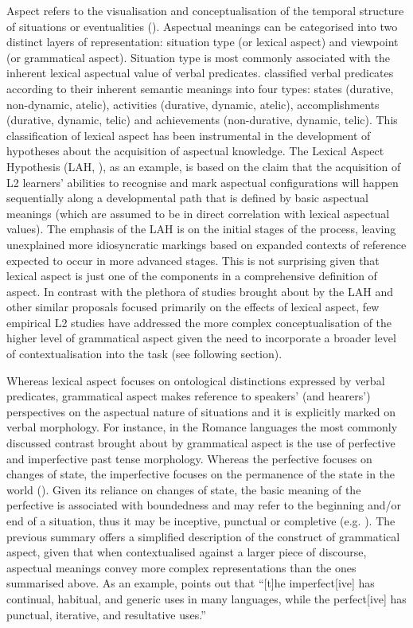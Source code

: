\documentclass[output=paper,modfonts,nonflat,newtxmath]{langsci/langscibook}
\begin{document}
Aspect refers to the visualisation and conceptualisation of the temporal structure of situations or eventualities (\citealt{Comrie1976, Dahl1985, Smith1997}). Aspectual meanings can be categorised into two distinct layers of representation: situation type (or lexical aspect) and viewpoint (or grammatical aspect). Situation type is most commonly associated with the inherent lexical aspectual value of verbal predicates. \citet{Vendler1967} classified verbal predicates according to their inherent semantic meanings into four types: states (durative, non-dynamic, atelic), activities (durative, dynamic, atelic), accomplishments (durative, dynamic, telic) and achievements (non-durative, dynamic, telic). This classification of lexical aspect has been instrumental in the development of hypotheses about the acquisition of aspectual knowledge. The Lexical Aspect Hypothesis (LAH, \citealt{Andersen1991}), as an example, is based on the claim that the acquisition of L2 learners’ abilities to recognise and mark aspectual configurations will happen sequentially along a developmental path that is defined by basic aspectual meanings (which are assumed to be in direct correlation with lexical aspectual values). The emphasis of the LAH is on the initial stages of the process, leaving unexplained more idiosyncratic markings based on expanded contexts of reference expected to occur in more advanced stages. This is not surprising given that lexical aspect is just one of the components in a comprehensive definition of aspect. In contrast with the plethora of studies brought about by the LAH and other similar proposals focused primarily on the effects of lexical aspect, few empirical L2 studies have addressed the more complex conceptualisation of the higher level of grammatical aspect given the need to incorporate a broader level of contextualisation into the task (see following section).

Whereas lexical aspect focuses on ontological distinctions expressed by verbal predicates, grammatical aspect makes reference to speakers’ (and hearers’) perspectives on the aspectual nature of situations and it is explicitly marked on verbal morphology. For instance, in the Romance languages the most commonly discussed contrast brought about by grammatical aspect is the use of perfective and imperfective past tense morphology. Whereas the perfective focuses on changes of state, the imperfective focuses on the permanence of the state in the world (\citealt{Klein1994,CaudalRoussarie2005}). Given its reliance on changes of state, the basic meaning of the perfective is associated with boundedness and may refer to the beginning and/or end of a situation, thus it may be inceptive, punctual or completive (e.g. \citealt{Depraetre1995}). The previous summary offers a simplified description of the construct of grammatical aspect, given that when contextualised against a larger piece of discourse, aspectual meanings convey more complex representations than the ones summarised above. As an example, \citet[156]{Binnick1991} points out that “[t]he imperfect[ive] has continual, habitual, and generic uses in many languages, while the perfect[ive] has punctual, iterative, and resultative uses.”
\end{document}

